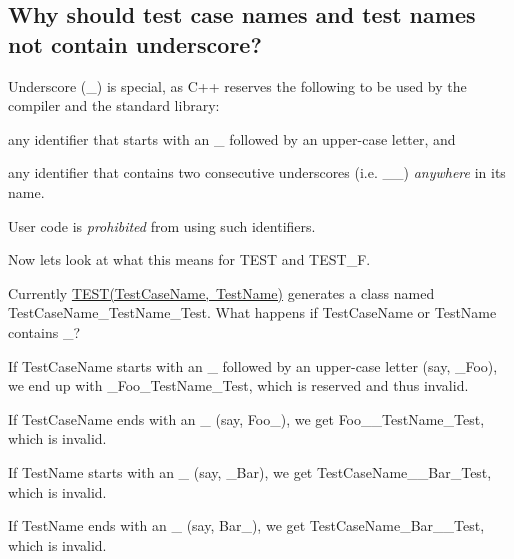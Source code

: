 \subsection*{Why should test case names and test names not contain underscore?}

Underscore ({\ttfamily \+\_\+}) is special, as C++ reserves the following to be used by the compiler and the standard library\+:


\begin{DoxyEnumerate}
\item any identifier that starts with an {\ttfamily \+\_\+} followed by an upper-\/case letter, and
\end{DoxyEnumerate}
\begin{DoxyEnumerate}
\item any identifier that contains two consecutive underscores (i.\+e. {\ttfamily \+\_\+\+\_\+}) {\itshape anywhere} in its name.
\end{DoxyEnumerate}

User code is {\itshape prohibited} from using such identifiers.

Now let\textquotesingle{}s look at what this means for {\ttfamily T\+E\+ST} and {\ttfamily T\+E\+S\+T\+\_\+F}.

Currently {\ttfamily \mbox{\hyperlink{gtest_8h_ad8b332753515c0ab8baada563c2547eb}{T\+E\+S\+T(\+Test\+Case\+Name, Test\+Name)}}} generates a class named {\ttfamily Test\+Case\+Name\+\_\+\+Test\+Name\+\_\+\+Test}. What happens if {\ttfamily Test\+Case\+Name} or {\ttfamily Test\+Name} contains {\ttfamily \+\_\+}?


\begin{DoxyEnumerate}
\item If {\ttfamily Test\+Case\+Name} starts with an {\ttfamily \+\_\+} followed by an upper-\/case letter (say, {\ttfamily \+\_\+\+Foo}), we end up with {\ttfamily \+\_\+\+Foo\+\_\+\+Test\+Name\+\_\+\+Test}, which is reserved and thus invalid.
\end{DoxyEnumerate}
\begin{DoxyEnumerate}
\item If {\ttfamily Test\+Case\+Name} ends with an {\ttfamily \+\_\+} (say, {\ttfamily Foo\+\_\+}), we get {\ttfamily Foo\+\_\+\+\_\+\+Test\+Name\+\_\+\+Test}, which is invalid.
\end{DoxyEnumerate}
\begin{DoxyEnumerate}
\item If {\ttfamily Test\+Name} starts with an {\ttfamily \+\_\+} (say, {\ttfamily \+\_\+\+Bar}), we get {\ttfamily Test\+Case\+Name\+\_\+\+\_\+\+Bar\+\_\+\+Test}, which is invalid.
\end{DoxyEnumerate}
\begin{DoxyEnumerate}
\item If {\ttfamily Test\+Name} ends with an {\ttfamily \+\_\+} (say, {\ttfamily Bar\+\_\+}), we get {\ttfamily Test\+Case\+Name\+\_\+\+Bar\+\_\+\+\_\+\+Test}, which is invalid.
\end{DoxyEnumerate}

